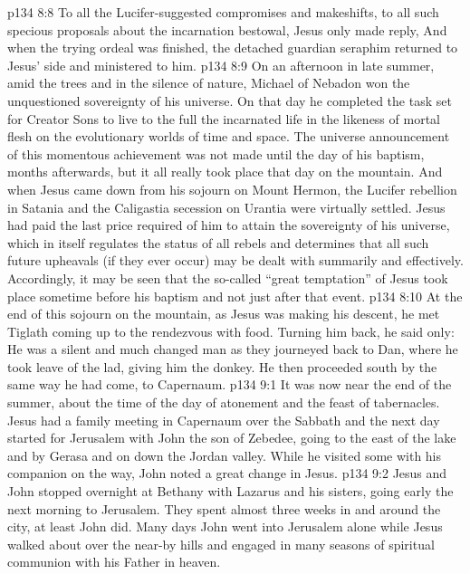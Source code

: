 \vs p134 8:8 To all the Lucifer\hyp{}suggested compromises and makeshifts, to all such specious proposals about the incarnation bestowal, Jesus only made reply,  And when the trying ordeal was finished, the detached guardian seraphim returned to Jesus’ side and ministered to him.
\vs p134 8:9 \pc On an afternoon in late summer, amid the trees and in the silence of nature, Michael of Nebadon won the unquestioned sovereignty of his universe. On that day he completed the task set for Creator Sons to live to the full the incarnated life in the likeness of mortal flesh on the evolutionary worlds of time and space. The universe announcement of this momentous achievement was not made until the day of his baptism, months afterwards, but it all really took place that day on the mountain. And when Jesus came down from his sojourn on Mount Hermon, the Lucifer rebellion in Satania and the Caligastia secession on Urantia were virtually settled. Jesus had paid the last price required of him to attain the sovereignty of his universe, which in itself regulates the status of all rebels and determines that all such future upheavals (if they ever occur) may be dealt with summarily and effectively. Accordingly, it may be seen that the so\hyp{}called “great temptation” of Jesus took place sometime before his baptism and not just after that event.
\vs p134 8:10 At the end of this sojourn on the mountain, as Jesus was making his descent, he met Tiglath coming up to the rendezvous with food. Turning him back, he said only:  He was a silent and much changed man as they journeyed back to Dan, where he took leave of the lad, giving him the donkey. He then proceeded south by the same way he had come, to Capernaum.
\vs p134 9:1 It was now near the end of the summer, about the time of the day of atonement and the feast of tabernacles. Jesus had a family meeting in Capernaum over the Sabbath and the next day started for Jerusalem with John the son of Zebedee, going to the east of the lake and by Gerasa and on down the Jordan valley. While he visited some with his companion on the way, John noted a great change in Jesus.
\vs p134 9:2 Jesus and John stopped overnight at Bethany with Lazarus and his sisters, going early the next morning to Jerusalem. They spent almost three weeks in and around the city, at least John did. Many days John went into Jerusalem alone while Jesus walked about over the near-by hills and engaged in many seasons of spiritual communion with his Father in heaven.
